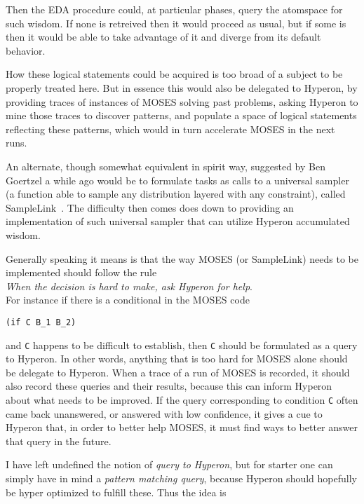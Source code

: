 \documentclass[]{report}
\begin{document}
Then the EDA procedure could, at particular phases, query the
atomspace for such wisdom.  If none is retreived then it would proceed
as usual, but if some is then it would be able to take advantage of it
and diverge from its default behavior.

How these logical statements could be acquired is too broad of a
subject to be properly treated here.  But in essence this would also
be delegated to Hyperon, by providing traces of instances of MOSES
solving past problems, asking Hyperon to mine those traces to discover
patterns, and populate a space of logical statements reflecting these
patterns, which would in turn accelerate MOSES in the next runs.

An alternate, though somewhat equivalent in spirit way, suggested by
Ben Goertzel a while ago would be to formulate tasks as calls to a
universal sampler (a function able to sample any distribution layered
with any constraint), called SampleLink~\cite{SampleLink}.  The
difficulty then comes does down to providing an implementation of such
universal sampler that can utilize Hyperon accumulated wisdom.

Generally speaking it means is that the way MOSES (or SampleLink)
needs to be implemented should follow the rule\\

\emph{When the decision is hard to make, ask Hyperon for help}.\\

For instance if there is a conditional in the MOSES code

\begin{verbatim}
(if C B_1 B_2)
\end{verbatim}

and \texttt{C} happens to be difficult to establish, then \texttt{C}
should be formulated as a query to Hyperon.  In other words, anything
that is too hard for MOSES alone should be delegate to Hyperon.  When
a trace of a run of MOSES is recorded, it should also record these
queries and their results, because this can inform Hyperon about what
needs to be improved.  If the query corresponding to
condition \texttt{C} often came back unanswered, or answered with low
confidence, it gives a cue to Hyperon that, in order to better help
MOSES, it must find ways to better answer that query in the future.

I have left undefined the notion of \emph{query to Hyperon}, but for
starter one can simply have in mind a \emph{pattern matching query},
because Hyperon should hopefully be hyper optimized to fulfill these.
Thus the idea is\\
\end{document}
